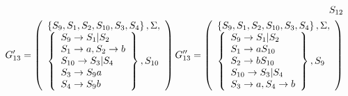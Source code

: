 \begin{align*}
{	}{S_{12}}                                                                                      \\
	G'_{13} = \left( \begin{array}{l} \left\{S_9, S_1, S_2, S_{10}, S_3, S_4\right\}, \Sigma,\\\left\{\begin{array}{ll} 
	S_9 \to S_1|S_2                                                                                \\
	S_1 \to a, S_2 \to b                                                                           \\
	S_{10} \to S_3|S_4                                                                             \\
	S_3 \to S_9a                                                                                   \\
	S_4 \to S_9b                                                                                   \\
	 \end{array}\right\}, S_{10} \end{array} \right)
	G''_{13} = \left( \begin{array}{l} \left\{S_9, S_1, S_2, S_{10}, S_3, S_4\right\}, \Sigma,\\\left\{\begin{array}{ll} 
	S_9 \to S_1|S_2                                                                                \\
	S_1 \to aS_{10}                                                                                \\
	S_2 \to bS_{10}                                                                                \\
	S_{10} \to S_3|S_4                                                                             \\
	S_3 \to a, S_4 \to b                                                                           \\
	 \end{array}\right\}, S_9 \end{array} \right)                                                                                         \\
\end{align*}
